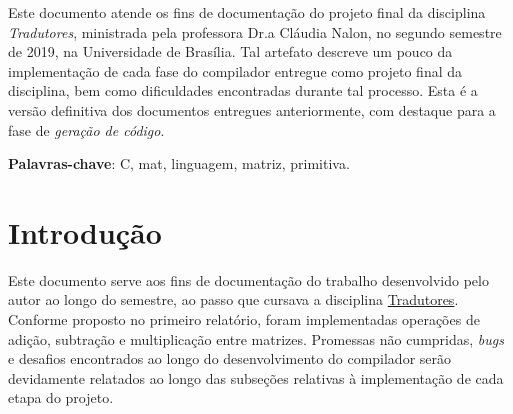 \documentclass[
	article,			%
	11pt,				%
	oneside,			%
	a4paper,			%
	english,			%
	brazil,				%
	sumario=tradicional
	]{abntex2}
\renewcommand{\it}[1]{\textit{#1}}
\begin{document}

\frenchspacing 


%
%

\maketitle





\begin{resumoumacoluna}
 Este documento atende os fins de documentação do projeto final da disciplina \textit{Tradutores},
 ministrada pela professora Dr.a Cláudia Nalon, no segundo semestre de 2019, na Universidade de Brasília. Tal artefato descreve um pouco da implementação de cada fase do compilador entregue como projeto final da disciplina, bem como dificuldades encontradas durante tal processo. Esta é a versão definitiva dos documentos entregues anteriormente, com destaque para a fase de \it{geração de código}.
 \vspace{\onelineskip}
 
 \noindent
 \textbf{Palavras-chave}: C, mat, linguagem, matriz, primitiva.
\end{resumoumacoluna}




\newcommand{\terminal}[1]{ \bnfpn{\textbf{#1}} }

\newcommand{\production}[1]{\bnfpn{\textit{#1}}}
\newcommand{\IT}[1]{\textit{#1}}
\newcommand{\BF}[1]{\textbf{#1}}


\section{Introdução}
Este documento serve aos fins de documentação do trabalho desenvolvido pelo autor ao longo do semestre, ao passo que cursava a disciplina  \href{https://matriculaweb.unb.br/graduacao/disciplina.aspx?cod=116459}{Tradutores}. Conforme proposto no primeiro relatório, foram implementadas operações de adição, subtração e multiplicação entre matrizes. Promessas não cumpridas, \it{bugs} e desafios encontrados ao longo do desenvolvimento do compilador serão devidamente relatados ao longo das subseções relativas à implementação de cada etapa do projeto. 
\end{document}
